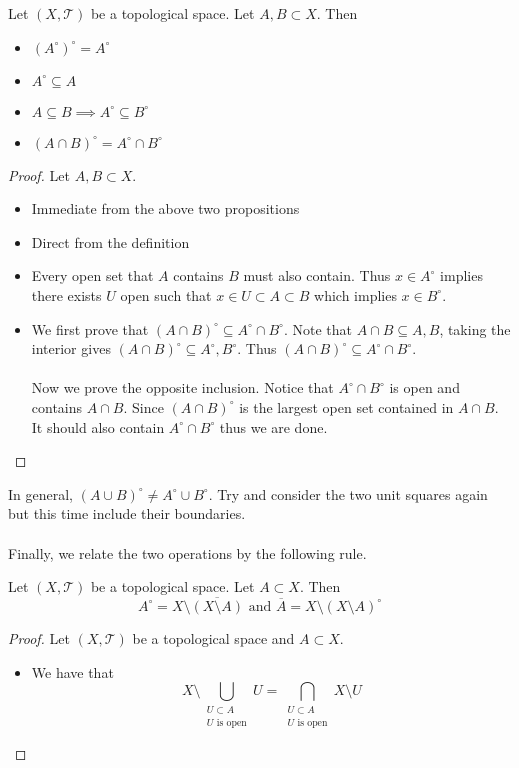 \documentclass[a4paper]{article}
\begin{document}
\begin{prp}{}{} Let $(X,\mathcal{T})$ be a topological space. Let $A,B\subset X$. Then
\begin{itemize}
\item $(A^\circ)^\circ=A^\circ$
\item $A^\circ\subseteq A$
\item $A\subseteq B\implies A^\circ\subseteq B^\circ$
\item $(A\cap B)^\circ=A^\circ\cap B^\circ$
\end{itemize}\tcbline
\begin{proof} Let $A,B\subset X$. 
\begin{itemize}
\item Immediate from the above two propositions
\item Direct from the definition
\item Every open set that $A$ contains $B$ must also contain. Thus $x\in A^\circ$ implies there exists $U$ open such that $x\in U\subset A\subset B$ which implies $x\in B^\circ$. 
\item We first prove that $(A\cap B)^\circ\subseteq A^\circ\cap B^\circ$. Note that $A\cap B\subseteq A,B$, taking the interior gives $(A\cap B)^\circ\subseteq A^\circ,B^\circ$. Thus $(A\cap B)^\circ\subseteq A^\circ\cap B^\circ$. \\~\\
Now we prove the opposite inclusion. Notice that $A^\circ\cap B^\circ$ is open and contains $A\cap B$. Since $(A\cap B)^\circ$ is the largest open set contained in $A\cap B$. It should also contain $A^\circ\cap B^\circ$ thus we are done. 
\end{itemize}
\end{proof}
\end{prp}

In general, $(A\cup B)^\circ\neq A^\circ\cup B^\circ$. Try and consider the two unit squares again but this time include their boundaries. \\~\\
Finally, we relate the two operations by the following rule. 

\begin{prp}{}{} Let $(X,\mathcal{T})$ be a topological space. Let $A\subset X$. Then $$A^\circ=X\setminus\overline{(X\setminus A)}\text{ and }\overline{A}=X\setminus(X\setminus A)^\circ$$ \tcbline
\begin{proof}
Let $(X,\mathcal{T})$ be a topological space and $A\subset X$. 
\begin{itemize}
\item We have that $$X\setminus\bigcup_{\substack{U\subset A\\U\text{ is open}}}U=\bigcap_{\substack{U\subset A\\U\text{ is open}}}X\setminus U$$
\end{itemize}
\end{proof}
\end{prp}
\end{document}
